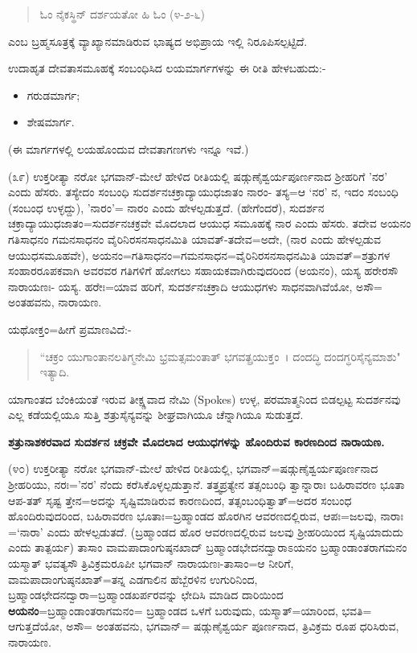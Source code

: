 \begin{verse}
ಓಂ ನೈಕಸ್ಥಿನ್ ದರ್ಶಯತೋ ಹಿ ಓಂ (೪-೨-೬)
\end{verse}

\noindent
ಎಂಬ ಬ್ರಹ್ಮಸೂತ್ರಕ್ಕೆ ವ್ಯಾಖ್ಯಾನಮಾಡಿರುವ ಭಾಷ್ಯದ ಅಭಿಪ್ರಾಯ ಇಲ್ಲಿ ನಿರೂಪಿಸಲ್ಪಟ್ಟಿದೆ.

ಉದಾಹೃತ ದೇವತಾಸಮೂಹಕ್ಕೆ ಸಂಬಂಧಿಸಿದ ಲಯಮಾರ್ಗಗಳನ್ನು ಈ ರೀತಿ ಹೇಳಬಹುದು:-

\begin{itemize}
\item ಗರುಡಮಾರ್ಗ;

 \item ಶೇಷಮಾರ್ಗ.

\end{itemize}

(ಈ ಮಾರ್ಗಗಳಲ್ಲಿ ಲಯಹೊಂದುವ ದೇವತಾಗಣಗಳು ಇನ್ನೂ ಇವೆ.)

(೩೯) ಉಕ್ತರೀತ್ಯಾ ನರೋ ಭಗವಾನ್-ಮೇಲೆ ಹೇಳಿದ ರೀತಿಯಲ್ಲಿ ಷಡ್ಗುಣೈಶ್ವರ್ಯಪೂರ್ಣನಾದ ಶ‍್ರೀಹರಿಗೆ 'ನರ' ಎಂದು ಹೆಸರು. ತಸ್ಯೇದಂ ಸಂಬಂಧಿ ಸುದರ್ಶನಚಕ್ರಾದ್ಯಾಯುಧಜಾತಂ ನಾರಂ- ತಸ್ಯ=ಆ `ನರ' ನ, ಇದಂ ಸಂಬಂಧಿ (ಸಂಬಂಧ ಉಳ್ಳದ್ದು), 'ನಾರಂ'= ನಾರಂ ಎಂದು ಹೇಳಲ್ಪಡುತ್ತದೆ. (ಹೇಗೆಂದರೆ), ಸುದರ್ಶನ ಚಕ್ರಾದ್ಯಾಯುಧಜಾತಂ=ಸುದರ್ಶನಚಕ್ರವೇ ಮೊದಲಾದ ಆಯುಧ ಸಮೂಹಕ್ಕೆ ನಾರ ಎಂದು ಹೆಸರು. ತದೇವ ಅಯನಂ ಗತಿಸಾಧನಂ ಗಮನಸಾಧನಂ ವೈರಿನಿರಸನಸಾಧನಮಿತಿ ಯಾವತ್-ತದೇವ=ಅದೇ, (ನಾರ ಎಂದು ಹೇಳಲ್ಪಡುವ ಆಯುಧಸಮೂಹವೇ), ಅಯನಂ=ಗತಿಸಾಧನಂ=ಗಮನಸಾಧನ=ವೈರಿನಿರಸನಸಾಧನಮಿತಿ ಯಾವತ್=ಶತ್ರುಗಳ ಸಂಹಾರರೂಪಕವಾಗಿ ಅವರವರ ಗತಿಗಳಿಗೆ ಹೋಗಲು ಸಹಾಯಕವಾಗಿರುವುದರಿಂದ (ಅಯನಂ), ಯಸ್ಯ ಹರೇರಸೌ‌ ನಾರಾಯಣಃ- ಯಸ್ಯ. ಹರೇಃ=ಯಾವ ಹರಿಗೆ, ಸುದರ್ಶನಚಕ್ರಾದಿ ಆಯುಧಗಳು ಸಾಧನವಾಗಿವೆಯೋ, ಅಸೌ= ಅಂತಹವನು, ನಾರಾಯಣ.

ಯಥೋಕ್ತಂ=ಹೀಗೆ ಪ್ರಮಾಣವಿದೆ:-

\begin{verse}
``ಚಕ್ರಂ ಯುಗಾಂತಾನಲತಿಗ್ಮನೇಮಿ ಭ್ರಮತ್ಸಮಂತಾತ್ ಭಗವತ್ಪ್ರಯುಕ್ತಂ~। ದಂದದ್ಧಿ ದಂದಗ್ಧರಿಸೈನ್ಯಮಾಶು" ಇತ್ಯಾದಿ.
\end{verse}

\noindent
ಯಾಗಾಂತದ ಬೆಂಕಿಯಂತೆ ಇರುವ ತೀಕ್ಷ್ಣವಾದ ನೇಮಿ (Spokes) ಉಳ್ಳ, ಪರಮಾತ್ಮನಿಂದ ಬಿಡಲ್ಪಟ್ಟ ಸುದರ್ಶನವು ಎಲ್ಲ ಕಡೆಯಲ್ಲಿಯೂ ಸುತ್ತಿ ಶತ್ರುಸೈನ್ಯವನ್ನು ಶೀಘ್ರವಾಗಿಯೂ ಚೆನ್ನಾಗಿಯೂ ಸುಡುತ್ತದೆ.

\begin{center}
\textbf{ಶತ್ರುನಾಶಕರವಾದ ಸುದರ್ಶನ ಚಕ್ರವೇ ಮೊದಲಾದ ಆಯುಧಗಳನ್ನು ಹೊಂದಿರುವ ಕಾರಣದಿಂದ ನಾರಾಯಣ.}
\end{center}

(೪೦) ಉಕ್ತರೀತ್ಯಾ ನರೋ ಭಗವಾನ್-ಮೇಲೆ ಹೇಳಿದ ರೀತಿಯಲ್ಲಿ, ಭಗವಾನ್=ಷಡ್ಗುಣೈಶ್ವರ್ಯಪೂರ್ಣನಾದ ಶ‍್ರೀಹರಿಯು, ನರಃ='ನರ' ನೆಂದು ಕರೆಸಿಕೊಳ್ಳಲ್ಪಡುತ್ತಾನೆ. ತತ್ತ್ವಪ್ರತ್ಯೇನ ತತ್ಸಂಬಂಧಿ ತ್ವಾನ್ನಾರಾಃ ಬಹಿರಾವರಣ ಭೂತಾ ಆಪ-ತತ್ ಸೃಷ್ಟ ತ್ತೇನ=ಅದನ್ನು ಸೃಷ್ಟಿಮಾಡಿರುವ ಕಾರಣದಿಂದ, ತತ್ಸಂಬಂಧಿತ್ವಾತ್=ಅದರ ಸಂಬಂಧ ಹೊಂದಿರುವುದರಿಂದ, ಬಹಿರಾವರಣ ಭೂತಾಃ=ಬ್ರಹ್ಮಾಂಡದ ಹೊರಗಿನ ಆವರಣದಲ್ಲಿರುವ, ಆಪಃ=ಜಲವು, ನಾರಾಃ =`ನಾರಾ' ಎಂದು ಹೇಳಲ್ಪಡುತದೆ. (ಬ್ರಹ್ಮಾಂಡದ ಹೊರ ಆವರಣದಲ್ಲಿರುವ ಜಲವು ಶ‍್ರೀಹರಿಯಿಂದ ಸೃಷ್ಟಿಯಾದುದು ಎಂದು ತಾತ್ಪರ್ಯ) ತಾಸಾಂ ವಾಮಪಾದಾಂಗುಷ್ಠನಖಾದ್ ಬ್ರಹ್ಮಾಂಡಭೇದನದ್ವಾರಾಽಯನಂ ಬ್ರಹ್ಮಾಂಡಾಂತರಾಗಮನಂ ಯಸ್ಮಾತ್ ಭವತ್ಯಸೌ ತ್ರಿವಿಕ್ರಮರೂಪೀ ಭಗವಾನ್ ನಾರಾಯಣಃ-ತಾಸಾಂ=ಆ ನೀರಿಗೆ, ವಾಮಪಾದಾಂಗುಷ್ಠನಖಾತ್=ತನ್ನ ಎಡಗಾಲಿನ ಹೆಬ್ಬೆರಳಿನ ಉಗುರಿನಿಂದ, ಬ್ರಹ್ಮಾಂಡಛೇದನದ್ವಾರಾ=ಬ್ರಹ್ಮಾಂಡಖರ್ಪರವನ್ನು ಛೇದಿಸಿ ಮಾಡಿದ ದಾರಿಯಿಂದ \textbf{ಅಯನಂ}=ಬ್ರಹ್ಮಾಂಡಾಂತರಾಗಮನಂ= ಬ್ರಹ್ಮಾಂಡದ ಒಳಗೆ ಬರುವುದು, ಯಸ್ಮಾತ್=ಯಾರಿಂದ, ಭವತಿ= ಆಗುತ್ತದೆಯೋ, ಅಸೌ= ಅಂತಹವನು, ಭಗವಾನ್= ಷಡ್ಗುಣೈಶ್ವರ್ಯ ಪೂರ್ಣನಾದ, ತ್ರಿವಿಕ್ರಮ ರೂಪ ಧರಿಸಿರುವ, ನಾರಾಯಣ.

